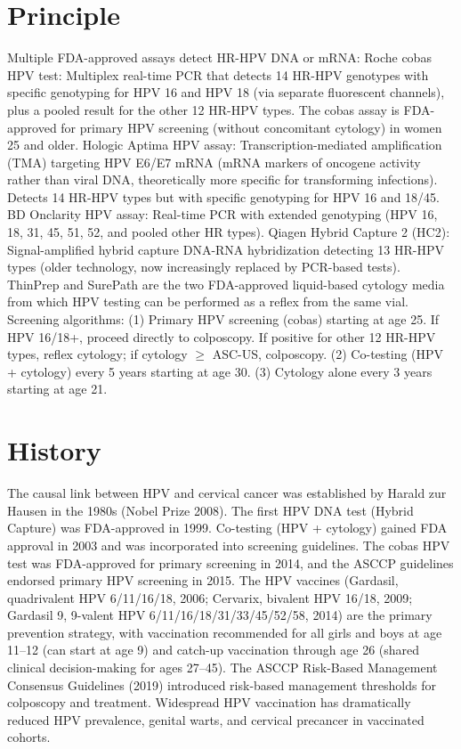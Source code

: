 \section*{Principle}
Multiple FDA-approved assays detect HR-HPV DNA or mRNA: Roche cobas HPV test: Multiplex real-time PCR that detects 14 HR-HPV genotypes with specific genotyping for HPV 16 and HPV 18 (via separate fluorescent channels), plus a pooled result for the other 12 HR-HPV types. The cobas assay is FDA-approved for primary HPV screening (without concomitant cytology) in women 25 and older. Hologic Aptima HPV assay: Transcription-mediated amplification (TMA) targeting HPV E6/E7 mRNA (mRNA markers of oncogene activity rather than viral DNA, theoretically more specific for transforming infections). Detects 14 HR-HPV types but with specific genotyping for HPV 16 and 18/45. BD Onclarity HPV assay: Real-time PCR with extended genotyping (HPV 16, 18, 31, 45, 51, 52, and pooled other HR types). Qiagen Hybrid Capture 2 (HC2): Signal-amplified hybrid capture DNA-RNA hybridization detecting 13 HR-HPV types (older technology, now increasingly replaced by PCR-based tests). ThinPrep and SurePath are the two FDA-approved liquid-based cytology media from which HPV testing can be performed as a reflex from the same vial. Screening algorithms: (1) Primary HPV screening (cobas) starting at age 25. If HPV 16/18+, proceed directly to colposcopy. If positive for other 12 HR-HPV types, reflex cytology; if cytology $\geq$ ASC-US, colposcopy. (2) Co-testing (HPV + cytology) every 5 years starting at age 30. (3) Cytology alone every 3 years starting at age 21.

\section*{History}
The causal link between HPV and cervical cancer was established by Harald zur Hausen in the 1980s (Nobel Prize 2008). The first HPV DNA test (Hybrid Capture) was FDA-approved in 1999. Co-testing (HPV + cytology) gained FDA approval in 2003 and was incorporated into screening guidelines. The cobas HPV test was FDA-approved for primary screening in 2014, and the ASCCP guidelines endorsed primary HPV screening in 2015. The HPV vaccines (Gardasil, quadrivalent HPV 6/11/16/18, 2006; Cervarix, bivalent HPV 16/18, 2009; Gardasil 9, 9-valent HPV 6/11/16/18/31/33/45/52/58, 2014) are the primary prevention strategy, with vaccination recommended for all girls and boys at age 11--12 (can start at age 9) and catch-up vaccination through age 26 (shared clinical decision-making for ages 27--45). The ASCCP Risk-Based Management Consensus Guidelines (2019) introduced risk-based management thresholds for colposcopy and treatment. Widespread HPV vaccination has dramatically reduced HPV prevalence, genital warts, and cervical precancer in vaccinated cohorts.

